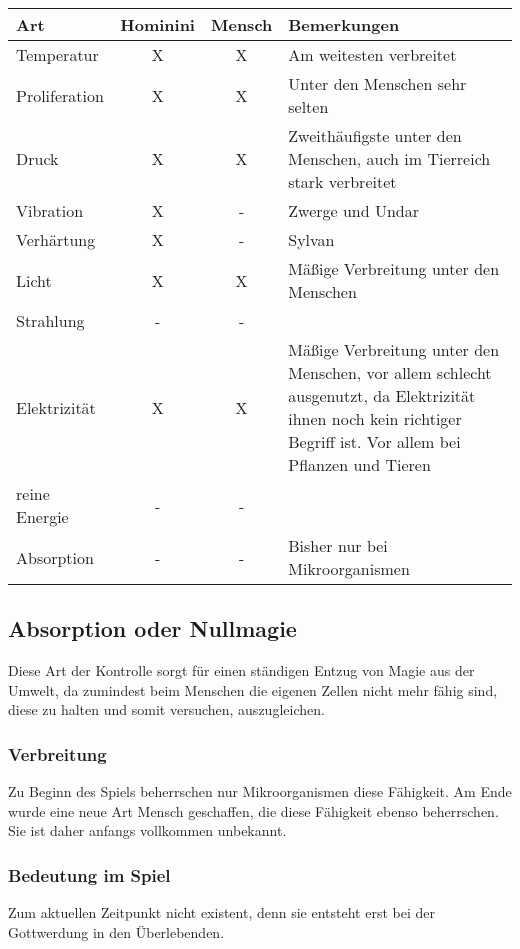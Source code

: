 \begin{tabular}{l||c|c|p{8cm}}
	\textbf{Art} & \textbf{Hominini} & \textbf{Mensch} & \textbf{Bemerkungen} \\
	\hline \hline
	Temperatur & X & X & Am weitesten verbreitet \\
	\hline
	Proliferation & X & X & Unter den Menschen sehr selten \\
	\hline
	Druck & X & X & Zweithäufigste unter den Menschen, auch im Tierreich stark verbreitet \\
	\hline
	Vibration & X & - & Zwerge und Undar \\
	\hline
	Verhärtung & X & - & Sylvan \\
	\hline
	Licht & X & X & Mäßige Verbreitung unter den Menschen \\
	\hline
	Strahlung & - & - &  \\
	\hline
	Elektrizität & X & X & Mäßige Verbreitung unter den Menschen, vor allem schlecht ausgenutzt, da Elektrizität ihnen noch kein richtiger Begriff ist. Vor allem bei Pflanzen und Tieren \\
	\hline
	reine Energie & - & - &   \\
	\hline
	Absorption & - & - & Bisher nur bei Mikroorganismen \\
\end{tabular}



\subsection{Absorption oder Nullmagie}\label{sec:nullmagie}
Diese Art der Kontrolle sorgt für einen ständigen Entzug von Magie aus der Umwelt, da zumindest beim Menschen die eigenen Zellen nicht mehr fähig sind, diese zu halten und somit versuchen, auszugleichen. 

\subsubsection{Verbreitung}
Zu Beginn des Spiels beherrschen nur Mikroorganismen diese Fähigkeit. Am Ende wurde eine neue Art Mensch geschaffen, die diese Fähigkeit ebenso beherrschen. Sie ist daher anfangs vollkommen unbekannt.

\subsubsection{Bedeutung im Spiel}
Zum aktuellen Zeitpunkt nicht existent, denn sie entsteht erst bei der Gottwerdung in den Überlebenden.

